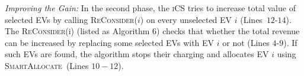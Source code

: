 \documentclass[journal]{IEEEtran}
\newcommand{\rev}[1]{{\color{black}#1}}%
\newcommand{\rev}[1]{#1}
\newcommand{\sa}{\textsc{SmartAllocate}}
\newcommand{\rc}{\textsc{ReConsider}}
\newcommand{\ics}{\textsc{iCS}\xspace}
\newcommand{\opt}{\textsc{OPT}\xspace}
\begin{document}
		\emph{Improving the Gain:} In the second phase, the \ics tries to increase total value of selected EVs by calling \rc($i$) on every unselected EV $i$ (Lines~$12$-$14$).  \rev{The \rc(i) (listed as Algorithm $6$) checks that whether the total revenue can be increased by replacing some selected EVs with EV $i$ or not (Lines $4$-$9$). If such EVs are found, the algorithm stops their charging and allocates EV $i$ using \sa\ (Lines $10-12$).} 
%		 
		
\end{document}
